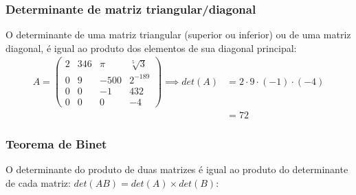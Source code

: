 \documentclass[pdftex, brazil]{beamer}
\begin{document}
\begin{frame}[t]
  \frametitle{Determinante de matriz triangular/diagonal}
  O determinante de uma matriz triangular (superior ou inferior) ou de uma
  matriz diagonal, é igual ao produto dos elementos de sua diagonal principal:
  \begin{equation*}\begin{split}A = \begin{pmatrix}
    2 & 346 & \pi & \sqrt[5]{3}\\
    0 & 9 & -500 & 2^{-189}\\
    0 & 0 & -1 & 432\\
    0 & 0 & 0 & -4\end{pmatrix} \implies det(A) &= 2 \cdot 9 \cdot (-1) \cdot (-4)\\
                                               &=72\end{split}\end{equation*}
\end{frame}

\begin{frame}[t]
  \frametitle{Teorema de Binet}
  O determinante do produto de duas matrizes é igual ao produto do determinante
  de cada matriz: $det(AB) = det(A) \times det(B)$:

\end{frame}
\end{document}
